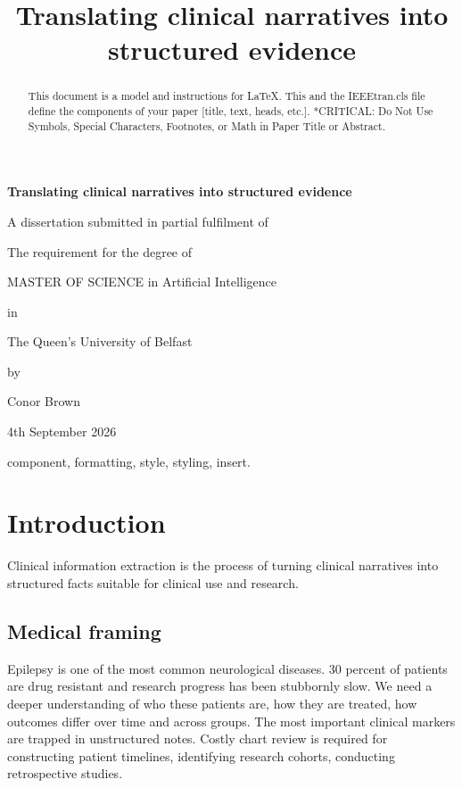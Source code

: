 \documentclass[conference]{IEEEtran}
\begin{document}
\begin{titlepage}
    \centering

    {\Huge\bfseries Translating clinical narratives into structured evidence\par}
    \vspace{2cm}

    {\large
    A dissertation submitted in partial fulfilment of\par
    The requirement for the degree of\par
    MASTER OF SCIENCE in Artificial Intelligence\par
    in\par
    The Queen’s University of Belfast\par
    by\par
    Conor Brown\par
    4th September 2026
    }
\end{titlepage}


\title{Translating clinical narratives into structured evidence\\}



\maketitle

\begin{abstract}
This document is a model and instructions for \LaTeX.
This and the IEEEtran.cls file define the components of your paper [title, text, heads, etc.]. *CRITICAL: Do Not Use Symbols, Special Characters, Footnotes, 
or Math in Paper Title or Abstract.
\end{abstract}

\begin{IEEEkeywords}
component, formatting, style, styling, insert.
\end{IEEEkeywords}

\section{Introduction}

Clinical information extraction is the process of turning clinical 
narratives into structured facts suitable for clinical use and research.

\subsection{Medical framing}
Epilepsy is one of the most common neurological diseases. 30 
percent of patients are drug resistant and research progress has 
been stubbornly slow. We need a deeper understanding of who 
these patients are, how they are treated, how outcomes differ over 
time and across groups. The most important clinical markers are 
trapped in unstructured notes. Costly chart review is required for 
constructing patient timelines, identifying research cohorts, 
conducting retrospective studies.
\end{document}
